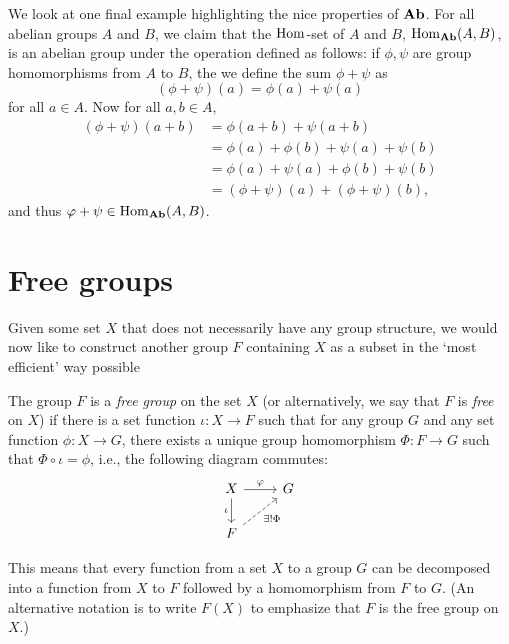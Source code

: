 We look at one final example highlighting the nice properties of \(\mathbf{Ab}\). For
all abelian groups \(A\) and \(B\), we claim that the \(\operatorname{Hom}\)-set of \(A\) and
\(B\), \(\operatorname{Hom}_{\mathbf{Ab}}(A, B)\), is an abelian group under the operation defined as
follows: if \(\phi, \psi\) are group homomorphisms from \(A\) to \(B\), the we
define the sum \(\phi + \psi\) as
\[
    (\phi + \psi)(a) = \phi(a) + \psi(a)
\]
for all \(a \in A\). Now for all \(a, b \in A\),
\begin{align*}
    (\phi + \psi)(a + b) &= \phi(a + b) + \psi(a + b)\\
    &= \phi(a) + \phi(b) + \psi(a) + \psi(b)\\
    &= \phi(a) + \psi(a) + \phi(b) + \psi(b)\\
    &= (\phi + \psi)(a) + (\phi + \psi)(b),
\end{align*}
and thus \(\varphi + \psi \in \operatorname{Hom}_{\mathbf{Ab}}(A, B)\).

\section{Free groups}

Given some set \(X\) that does not necessarily have any group structure, we
would now like to construct another group \(F\) containing \(X\) as a subset in
the `most efficient' way possible

\begin{definition}
    \label{def:free-group}
    The group \(F\) is a \emph{free group} on the set \(X\) (or alternatively,
    we say that \(F\) is \emph{free} on \(X\)) if there is a set function
    \(\iota: X \to F\) such that for any group \(G\) and any set function
    \(\phi: X \to G\), there exists a unique group homomorphism \(\Phi: F \to
    G\) such that \(\Phi \circ \iota = \phi\), i.e., the following diagram
    commutes:
    \[
        \begin{tikzcd}
            X \arrow[d, "\iota"'] \arrow[r, "\phi"] & G \\
            F \arrow[ru, "\exists!\Phi"', dashed]        &  
        \end{tikzcd}
    \]
\end{definition}

This means that every function from a set \(X\) to a group \(G\) can be
decomposed into a function from \(X\) to \(F\) followed by a homomorphism from
\(F\) to \(G\). (An alternative notation is to write \(F(X)\) to emphasize that
\(F\) is the free group on \(X\).)

